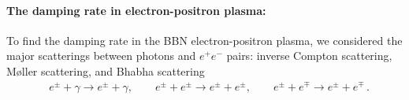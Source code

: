 

\paragraph{The damping rate in electron-positron plasma:}
To find the damping rate in the BBN electron-positron plasma, we considered the major scatterings between photons and $e^+e^-$ pairs: inverse Compton scattering, M{\o}ller scattering, and Bhabha scattering
\begin{align}
&e^\pm+\gamma\longrightarrow e^\pm+\gamma,\qquad e^\pm+e^\pm\longrightarrow e^\pm+e^\pm,\qquad e^\pm+e^\mp\longrightarrow e^\pm+e^\mp\,.
\end{align}

